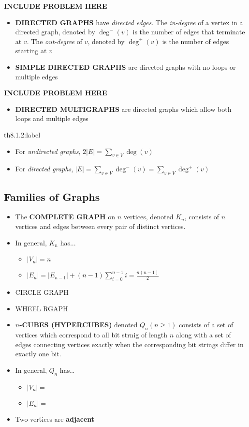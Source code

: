 \textbf{INCLUDE PROBLEM HERE}

\begin{itemize}
    \item \textbf{DIRECTED GRAPHS} have \textit{directed edges}. The \textit{in-degree} of a vertex in a directed graph, denoted by $\deg^-(v)$ is the number of edges that terminate at $v$. The \textit{out-degree} of $v$, denoted by $\deg^+(v)$ is the number of edges starting at $v$
    \item \textbf{SIMPLE DIRECTED GRAPHS} are directed graphs with no loops or multiple edges
\end{itemize}

\textbf{INCLUDE PROBLEM HERE}

\begin{itemize}
    \item \textbf{DIRECTED MULTIGRAPHS} are directed graphs which allow both loops and multiple edges
\end{itemize}


\begin{theorem}{th8.1.2:label}
    \begin{itemize}
        \item For \textit{undirected graphs}, $2|E| = \sum_{v\in V} \deg(v)$
        \item For \textit{directed graphs}, $|E| = \sum_{v\in V} \deg^-(v) = \sum_{v\in V} \deg^+(v)$
    \end{itemize}
\end{theorem}


\subsection{Families of Graphs}

\begin{itemize}
    \item The \textbf{COMPLETE GRAPH} on $n$ vertices, denoted $K_n$, consists of $n$ vertices and edges between every pair of distinct vertices.
    \item In general, $K_n$ has...
    \begin{itemize}
        \item $|V_n| = n$
        \item $|E_n| = |E_{n-1}| + (n-1) \sum_{i=0}^{n-1}i = \frac{n(n-1)}{2}$
    \end{itemize} 
    \item CIRCLE GRAPH
    \item WHEEL RGAPH
    \item \textbf{$n$-CUBES (HYPERCUBES)} denoted $Q_n(n\ge 1)$ consists of a set of vertices which correspond to all bit strnig of length $n$ along with a set of edges connecting vertices exactly when the corresponding bit strings differ in exactly one bit.
    \item In general, $Q_n$ has\dots
    \begin{itemize}
        \item $|V_n| = $
        \item $|E_n| = $
    \end{itemize}
\end{itemize}




\begin{itemize}
    \item Two vertices are \textbf{adjacent} 
\end{itemize}